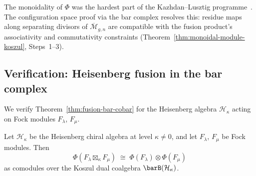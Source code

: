 \begin{remark}\label{rem:fusion-scope}
The monoidality of $\Phi$ was the hardest part of the
Kazhdan--Lusztig programme~\cite{KL93}.  The configuration space
proof via the bar complex resolves this: residue
maps along separating divisors of $\overline{\mathcal{M}}_{g,n}$
are compatible with the fusion product's associativity and commutativity
constraints (Theorem~\ref{thm:monoidal-module-koszul}, Steps~1--3).
\end{remark}

\subsection{Verification: Heisenberg fusion in the bar complex}
\label{subsec:heisenberg-fusion-verification}

We verify Theorem~\ref{thm:fusion-bar-cobar} for the Heisenberg algebra
$\mathcal{H}_\kappa$ acting on Fock modules $F_\lambda$, $F_\mu$.

\begin{proposition}\label{prop:heisenberg-fusion-splitting}
Let $\mathcal{H}_\kappa$ be the Heisenberg chiral algebra at
level $\kappa \neq 0$, and let $F_\lambda$, $F_\mu$ be Fock
modules.  Then
\begin{equation}\label{eq:heisenberg-fusion-splitting}
\Phi(F_\lambda \boxtimes_\kappa F_\mu)
\;\cong\;
\Phi(F_\lambda) \otimes \Phi(F_\mu)
\end{equation}
as comodules over the Koszul dual coalgebra
$\barB(\mathcal{H}_\kappa)$.
\end{proposition}

